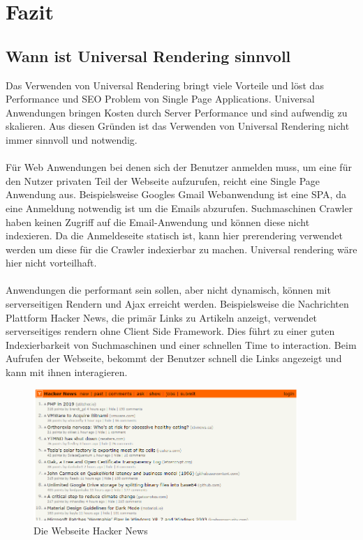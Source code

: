 \documentclass[runningheads]{llncs}
\numberwithin{figure}{section}
\begin{document}
\section{Fazit}
\label{sec:Fazit}

\subsection{Wann ist Universal Rendering sinnvoll}
\label{subsec:Wann ist Universal Rendering sinnvoll}
Das Verwenden von Universal Rendering bringt viele Vorteile und 
löst das Performance und SEO Problem von Single Page Applications. 
Universal Anwendungen bringen Kosten durch Server Performance und sind aufwendig zu skalieren. 
Aus diesen Gründen ist das Verwenden von Universal Rendering nicht immer sinnvoll und notwendig.
\\
\\
Für Web Anwendungen bei denen sich der Benutzer anmelden muss, 
um eine für den Nutzer privaten Teil der Webseite aufzurufen, 
reicht eine Single Page Anwendung aus. 
Beispielsweise Googles Gmail Webanwendung ist eine SPA, 
da eine Anmeldung notwendig ist um die Emails abzurufen. 
Suchmaschinen Crawler haben keinen Zugriff auf die Email-Anwendung und 
können diese nicht indexieren. 
Da die Anmeldeseite statisch ist, 
kann hier prerendering verwendet werden um diese für die Crawler indexierbar zu machen. 
Universal rendering wäre hier nicht vorteilhaft.
\\
\\
Anwendungen die performant sein sollen, 
aber nicht dynamisch, können mit serverseitigen Rendern und 
Ajax erreicht werden. Beispielsweise die Nachrichten Plattform Hacker News, 
die primär Links zu Artikeln anzeigt, 
verwendet serverseitiges rendern ohne Client Side Framework. 
Dies führt zu einer guten Indexierbarkeit von Suchmaschinen und 
einer schnellen Time to interaction. Beim Aufrufen der Webseite, 
bekommt der Benutzer schnell die Links angezeigt und 
kann mit ihnen interagieren. 
\begin{figure}
  \centering
  \includegraphics[width=10cm]{images/HackerNews}
  \caption{Die Webseite Hacker News}
  \label{Die WEbseite HackerNews}
\end{figure}
\end{document}
